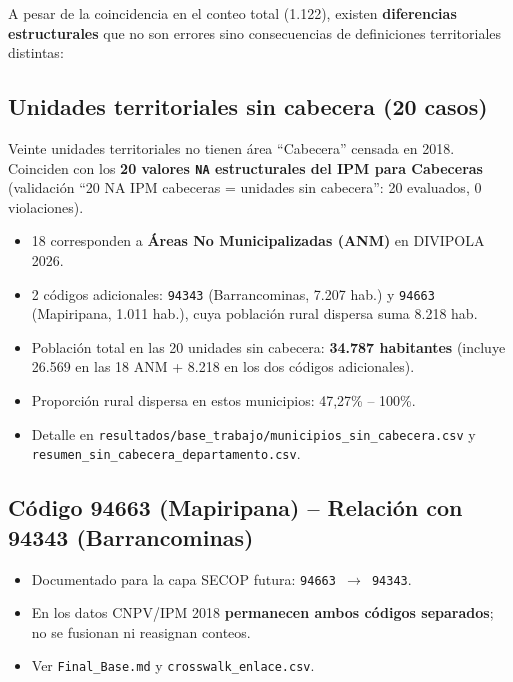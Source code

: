 A pesar de la coincidencia en el conteo total (1.122), existen \textbf{diferencias estructurales} que no son errores sino consecuencias de definiciones territoriales distintas:

\subsection{Unidades territoriales sin cabecera (20 casos)}
\label{sec:municipios_sin_cabecera}

Veinte unidades territoriales no tienen área ``Cabecera'' censada en 2018. Coinciden con los \textbf{20 valores \texttt{NA} estructurales del IPM para Cabeceras} (validación ``20 NA IPM cabeceras = unidades sin cabecera'': 20 evaluados, 0 violaciones).

\begin{itemize}
    \item 18 corresponden a \textbf{Áreas No Municipalizadas (ANM)} en DIVIPOLA 2026.
    \item 2 códigos adicionales: \texttt{94343} (Barrancominas, 7.207 hab.) y \texttt{94663} (Mapiripana, 1.011 hab.), cuya población rural dispersa suma 8.218 hab.
    \item Población total en las 20 unidades sin cabecera: \textbf{34.787 habitantes} (incluye 26.569 en las 18 ANM + 8.218 en los dos códigos adicionales).
    \item Proporción rural dispersa en estos municipios: 47,27\% -- 100\%.
    \item Detalle en \texttt{resultados/base\_trabajo/municipios\_sin\_cabecera.csv} y \texttt{resumen\_sin\_cabecera\_departamento.csv}.
\end{itemize}

\subsection{Código 94663 (Mapiripana) -- Relación con 94343 (Barrancominas)}
\label{sec:94663}

\begin{itemize}
    \item Documentado para la capa SECOP futura: \texttt{94663 $\rightarrow$ 94343}.
    \item En los datos CNPV/IPM 2018 \textbf{permanecen ambos códigos separados}; no se fusionan ni reasignan conteos.
    \item Ver \texttt{Final\_Base.md} y \texttt{crosswalk\_enlace.csv}.
\end{itemize}

